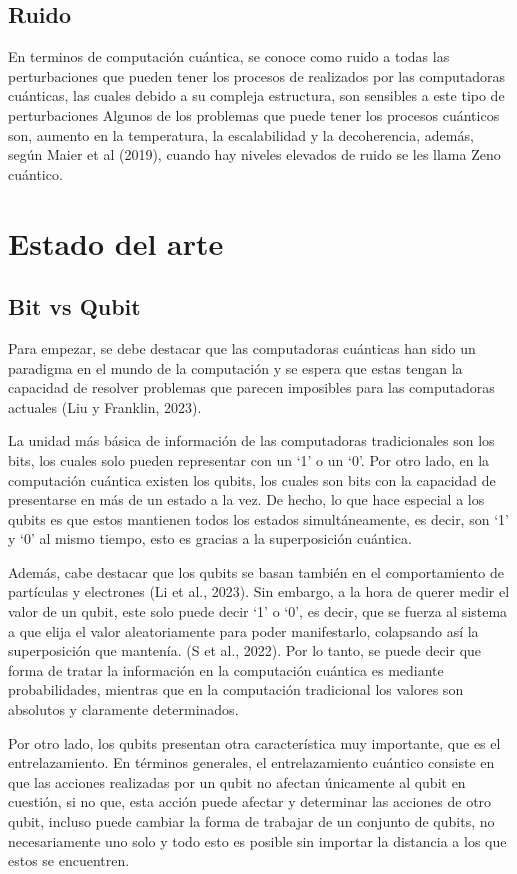 \documentclass[twoside]{article}
\begin{document}
\subsection{Ruido}
En terminos de computación cuántica, se conoce como ruido a todas las perturbaciones que pueden tener los procesos de realizados por las computadoras cuánticas, las cuales debido a su compleja estructura, son sensibles a este tipo de perturbaciones Algunos de los problemas que puede tener los procesos cuánticos son, aumento en la temperatura, la escalabilidad y la decoherencia, además, según Maier et al (2019), cuando hay niveles elevados de ruido se les llama Zeno cuántico. 

\newpage
\section{Estado del arte}
\subsection{Bit vs Qubit}
 Para empezar, se debe destacar que las computadoras cuánticas han sido un paradigma en el mundo de la computación y se espera que estas tengan la capacidad de resolver problemas que parecen imposibles para las computadoras actuales (Liu y Franklin, 2023).
 
 La unidad más básica de información de las computadoras tradicionales son los bits, los cuales solo pueden representar con un ‘1’ o un ‘0’. Por otro lado, en la computación cuántica existen los qubits, los cuales son bits con la capacidad de presentarse en más de un estado a la vez. De hecho, lo que hace especial a los qubits es que estos mantienen todos los estados simultáneamente, es decir, son ‘1’ y ‘0’ al mismo tiempo, esto es gracias a la superposición cuántica. 
 
 Además, cabe destacar que los qubits se basan también en el comportamiento de partículas y electrones (Li et al., 2023). Sin embargo, a la hora de querer medir el valor de un qubit, este solo puede decir ‘1’ o ‘0’, es decir, que se fuerza al sistema a que elija el valor aleatoriamente para poder manifestarlo, colapsando así la superposición que mantenía. (S et al., 2022). Por lo tanto, se puede decir que forma de tratar la información en la computación cuántica es mediante probabilidades, mientras que en la computación tradicional los valores son absolutos y claramente determinados.

Por otro lado, los qubits presentan otra característica muy importante, que es el entrelazamiento. En términos generales, el entrelazamiento cuántico consiste en que las acciones realizadas por un qubit no afectan únicamente al qubit en cuestión, si no que, esta acción puede afectar y determinar las acciones de otro qubit, incluso puede cambiar la forma de trabajar de un conjunto de qubits, no necesariamente uno solo y todo esto es posible sin importar la distancia a los que estos se encuentren. 
\end{document}
